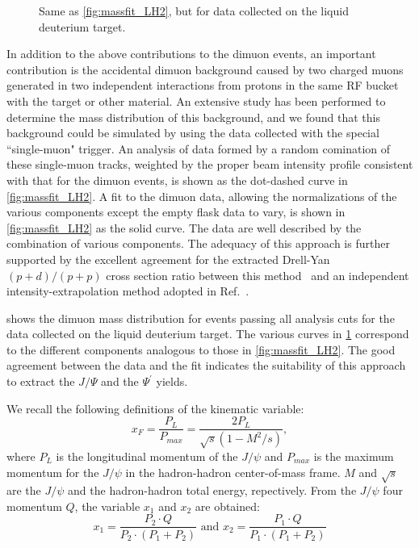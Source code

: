 \documentclass[twocolumn,aps,unsortedaddress,superscriptaddress,prd,floatfix,showpacs,linenumbers]{revtex4-2}
\begin{document}
\begin{figure}
	\caption{Same as \cref{fig:massfit_LH2}, but for data collected on the liquid
		deuterium target.}
	\label{fig:massfit_LD2}
\end{figure}

In addition to the above contributions to the dimuon events, an important
contribution is the accidental dimuon background caused by two charged 
muons generated in two independent interactions from protons in the same 
RF bucket with the target or other material. An extensive
study has been performed to determine the mass distribution of this background,
and we found that this background could be simulated by using
the data collected with the special ``single-muon" trigger. An analysis
of data formed by a random 
comination of these single-muon tracks, weighted by the proper beam intensity
profile consistent with that for the dimuon events, is shown as the dot-dashed
curve in \cref{fig:massfit_LH2}. A fit to the dimuon data, allowing the normalizations of
the various components except the empty flask data to vary, is shown in \cref{fig:massfit_LH2}
as the solid curve. The data are well described by the combination of various
components. The adequacy of this approach is further supported by the excellent
agreement for the extracted Drell-Yan $(p+d) / (p+p)$ cross section ratio 
between this method~\cite{dove2023} and an independent intensity-extrapolation
method adopted in Ref.~\cite{dove2021}.

 shows the dimuon mass distribution for events passing all analysis
cuts for the data collected on the liquid deuterium target. The various curves
in \cref{fig:massfit_LD2} correspond to the different components analogous to those in \cref{fig:massfit_LH2}.
The good agreement between the data and the fit indicates the suitability of
this approach to extract the $J/\Psi$ and the $\Psi^\prime$ yields. 

We recall the following definitions of the kinematic variable:
\begin{equation}
	x_F = \frac{P_L}{P_{max}}=\frac{2P_L}{\sqrt{s}\left(1-M^2/s\right)},
\end{equation}
where $P_L$ is the longitudinal momentum of the $J/\psi$ and $P_{max}$ is
the maximum momentum for the $J/\psi$ in the hadron-hadron center-of-mass
frame. $M$ and $\sqrt{s}$ are the $J/\psi$ and the hadron-hadron total energy,
repectively. From the $J/\psi$ four momentum $Q$, the variable $x_1$ and $x_2$
are obtained:
\begin{equation}
	x_1=\frac{P_2\cdot Q}{P_2 \cdot \left(P_1 + P_2\right)} \textrm{ and } x_2=\frac{P_1\cdot Q}{P_1 \cdot \left(P_1 + P_2\right)} 
\end{equation}
\end{document}
